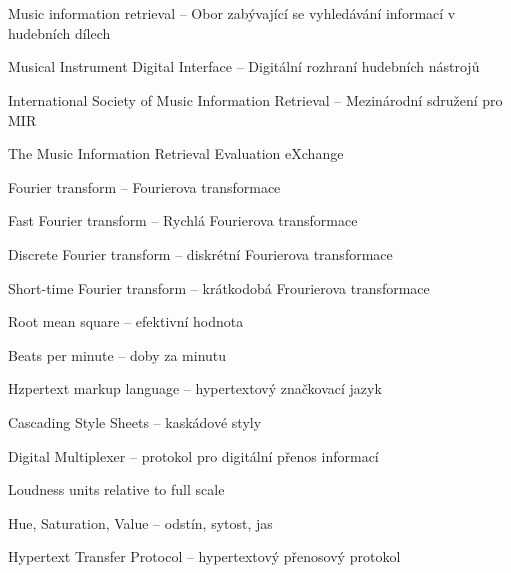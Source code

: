 \cleardoublepage
\chapter*{\listofabbrevname}
{}

\begin{acronym}[KolikMista]
		{Music information retrieval -- Obor zabývající se vyhledávání informací v hudebních dílech}
	
		{Musical Instrument Digital Interface -- Digitální rozhraní hudebních nástrojů}

		{International Society of Music Information Retrieval -- Mezinárodní sdružení pro \acs*{MIR}}	

		{The Music Information Retrieval Evaluation eXchange}

		{Fourier transform -- Fourierova transformace}
		
		{Fast Fourier transform -- Rychlá Fourierova transformace}

		{Discrete Fourier transform -- diskrétní Fourierova transformace}

		{Short-time Fourier transform -- krátkodobá Frourierova transformace}
	
		{Root mean square -- efektivní hodnota}

		{Beats per minute -- doby za minutu}

		{Hzpertext markup language --  hypertextový značkovací jazyk}

	{Cascading Style Sheets -- kaskádové styly}

		{Digital Multiplexer -- protokol pro digitální přenos informací}
	
		{Loudness units relative to full scale}
	
		{Hue, Saturation, Value -- odstín, sytost, jas}

		{Hypertext Transfer Protocol -- hypertextový přenosový protokol}
\end{acronym}
